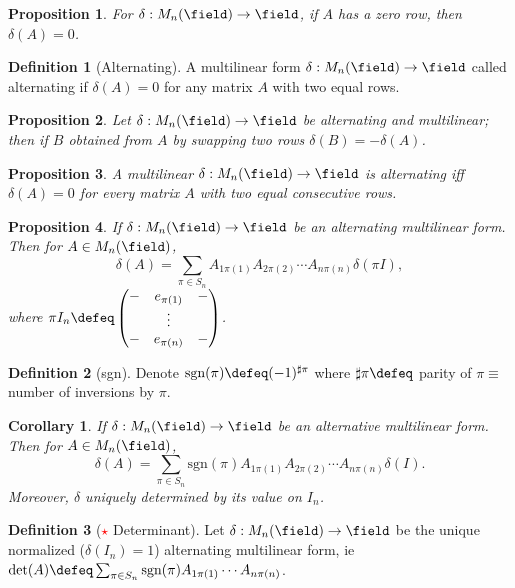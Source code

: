 \documentclass[12pt, oneside]{article}
\theoremstyle{definition}
\newtheorem{defn}{Definition}
\theoremstyle{plain}
\newtheorem{cor}{Corollary}
\newtheorem{prop}{Proposition}
\theoremstyle{remark}
\begin{document}
\begin{prop}
  For $\delta : M_n(\field)
\to \field$, if $A$ has a zero row, then $\delta(A) = 0$.
\end{prop}

\begin{defn}[Alternating]
  A multilinear form $\delta : M_n(\field) \to \field$ called alternating if $\delta(A) = 0$ for any matrix $A$ with two equal rows.
\end{defn}

\begin{prop}
  Let $\delta : M_n(\field) \to \field$ be alternating and multilinear; then if $B$ obtained from $A$ by swapping two rows $\delta(B) = - \delta(A)$. 
\end{prop}

\begin{prop}
  A multilinear $\delta : M_n(\field) \to \field$ is alternating iff $\delta(A) = 0$ for every matrix $A$ with two equal consecutive rows.
\end{prop}

\begin{prop}
  If $\delta : M_n(\field) \to \field$ be an alternating multilinear form. Then for $A \in M_n(\field)$, \[\delta(A) =\sum_{\pi \in S_n} A_{1\pi(1)} A_{2 \pi(2)} \cdots A_{n \pi(n)} \delta(\pi I),\]
  where $\pi I_n \defeq \begin{pmatrix}
    - & e_{\pi(1)} & -\\
        & \vdots & \\
        - & e_{\pi(n)} & -
  \end{pmatrix}$.
\end{prop}
\begin{defn}[sgn]
  Denote $\text{sgn}(\pi) \defeq (-1)^{\sharp \pi}$ where $\sharp \pi \defeq$ parity of $\pi \equiv$ number of inversions by $\pi$.
\end{defn}

\begin{cor}
  If $\delta : M_n(\field) \to \field$ be an alternative multilinear form. Then for $A \in M_n(\field)$, \[ \delta(A) = \sum_{\pi \in S_n} \text{sgn}(\pi)A_{1\pi(1)} A_{2 \pi(2)} \cdots A_{n \pi(n)} \delta(I).\]
  Moreover, $\delta$ uniquely determined by its value on $I_n$.
\end{cor}

\begin{defn}[\textcolor{red}{$\star$} Determinant]
  Let $\delta : M_n(\field) \to \field$ be the unique normalized ($\delta(I_n) = 1$) alternating multilinear form, ie $\det(A) \defeq \sum_{ \pi \in S_n} \text{sgn}(\pi) A_{1 \pi(1)} \cdots A_{n \pi(n)}$.
\end{defn}
\end{document}
